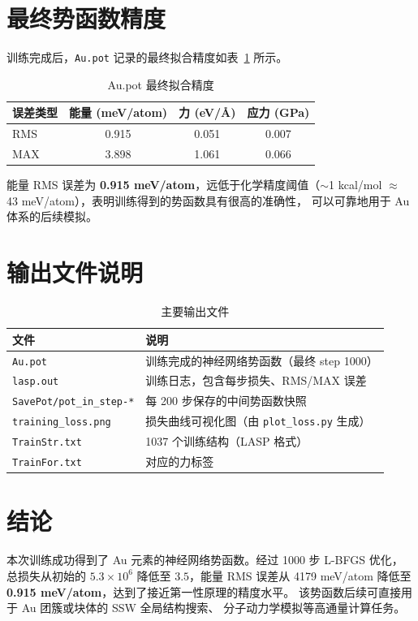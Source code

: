 \documentclass[12pt, a4paper]{article}
\begin{document}
\section{最终势函数精度}

训练完成后，\texttt{Au.pot} 记录的最终拟合精度如表~\ref{tab:accuracy} 所示。

\begin{table}[H]
  \centering
  \caption{Au.pot 最终拟合精度}
  \label{tab:accuracy}
  \begin{tabular}{lccc}
    \toprule
    误差类型 & 能量 (meV/atom) & 力 (eV/\AA) & 应力 (GPa) \\
    \midrule
    RMS & 0.915 & 0.051 & 0.007 \\
    MAX & 3.898 & 1.061 & 0.066 \\
    \bottomrule
  \end{tabular}
\end{table}

能量 RMS 误差为 \textbf{0.915 meV/atom}，远低于化学精度阈值（$\sim$1 kcal/mol
$\approx$ 43 meV/atom），表明训练得到的势函数具有很高的准确性，
可以可靠地用于 Au 体系的后续模拟。

\section{输出文件说明}

\begin{table}[H]
  \centering
  \caption{主要输出文件}
  \begin{tabular}{ll}
    \toprule
    文件 & 说明 \\
    \midrule
    \texttt{Au.pot}              & 训练完成的神经网络势函数（最终 step 1000） \\
    \texttt{lasp.out}            & 训练日志，包含每步损失、RMS/MAX 误差 \\
    \texttt{SavePot/pot\_in\_step-*} & 每 200 步保存的中间势函数快照 \\
    \texttt{training\_loss.png}  & 损失曲线可视化图（由 \texttt{plot\_loss.py} 生成） \\
    \texttt{TrainStr.txt}        & 1037 个训练结构（LASP 格式） \\
    \texttt{TrainFor.txt}        & 对应的力标签 \\
    \bottomrule
  \end{tabular}
\end{table}

\section{结论}

本次训练成功得到了 Au 元素的神经网络势函数。经过 1000 步 L-BFGS 优化，
总损失从初始的 $5.3\times10^6$ 降低至 $3.5$，能量 RMS 误差从 4179 meV/atom
降低至 \textbf{0.915 meV/atom}，达到了接近第一性原理的精度水平。
该势函数后续可直接用于 Au 团簇或块体的 SSW 全局结构搜索、
分子动力学模拟等高通量计算任务。
\end{document}
